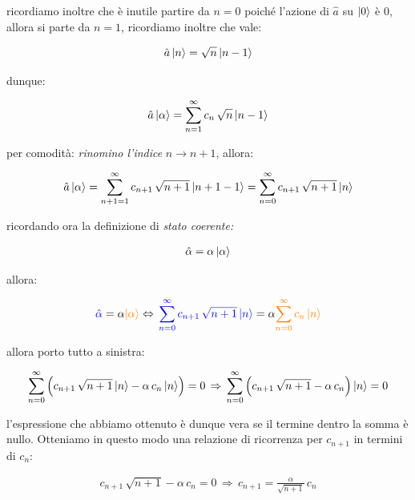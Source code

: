 	ricordiamo inoltre che è inutile partire da $ n = 0$ poiché l'azione di $\hat{a}$ su $\ket{0}$ è $0$, allora si parte da $n = 1$, ricordiamo inoltre che vale:
	
\begin{align*}
	\hat{a} \ket{n} = \sqrt{n} \ket{n-1} 
\end{align*}

	dunque:
	
\begin{align*}
	\hat{a} \ket{\alpha} = \sum_{n = 1}^{\infty} c_n \, \sqrt{n} \ket{n-1} 
\end{align*}
	
	per comodità: \textit{rinomino l'indice} $n \to n +1$, allora: 
	
\begin{align*}
	\hat{a} \ket{\alpha} = \sum_{n +1 = 1}^{\infty} c_{n +1} \, \sqrt{n +1} \ket{n +1-1} = \sum_{n = 0}^{\infty} c_{n +1} \, \sqrt{n +1} \ket{n} 
\end{align*}
	
	ricordando ora la definizione di \textit{stato coerente:}
	
\begin{align*}
	\hat{\alpha} = \alpha \ket{\alpha} 
\end{align*}
	
	allora:

\begin{align*}
	\textcolor{blue}{\hat{\alpha}} = \alpha \textcolor{orange}{\ket{\alpha} } \Leftrightarrow \, \textcolor{blue}{\sum_{n = 0}^{\infty} c_{n +1} \, \sqrt{n +1} \ket{n}}  = \alpha \textcolor{orange}{\sum_{n = 0}^{\infty} c_n \ket{n} }
\end{align*}
	
	allora porto tutto a sinistra:
	
\begin{align*}
	\sum_{n = 0}^{\infty} \qty\Big(c_{n +1} \, \sqrt{n +1} \ket{n} - \alpha \, c_n \ket{n}) = 0 \, \Rightarrow \, \sum_{n = 0}^{\infty} \qty\Big(c_{n +1} \, \sqrt{n +1} - \alpha \, c_n ) \ket{n} = 0 
\end{align*}

	l'espressione che abbiamo ottenuto è dunque vera se il termine dentro la somma è nullo. Otteniamo in questo modo una relazione di ricorrenza per $c_{n+1}$ in termini di $c_n$:
	
\begin{align*}
	c_{n +1} \, \sqrt{n +1} - \alpha \, c_n = 0\, \Rightarrow \, c_{n+1} = \frac{\alpha}{\sqrt{n+1}} \, c_n
\end{align*}
	
